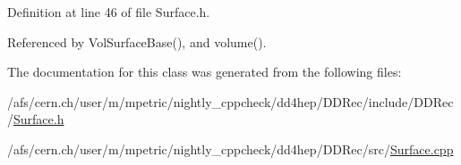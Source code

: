 Definition at line 46 of file Surface.h.

Referenced by VolSurfaceBase(), and volume().

The documentation for this class was generated from the following files:\begin{DoxyCompactItemize}
\item 
/afs/cern.ch/user/m/mpetric/nightly\_\-cppcheck/dd4hep/DDRec/include/DDRec/\hyperlink{_surface_8h}{Surface.h}\item 
/afs/cern.ch/user/m/mpetric/nightly\_\-cppcheck/dd4hep/DDRec/src/\hyperlink{_surface_8cpp}{Surface.cpp}\end{DoxyCompactItemize}
